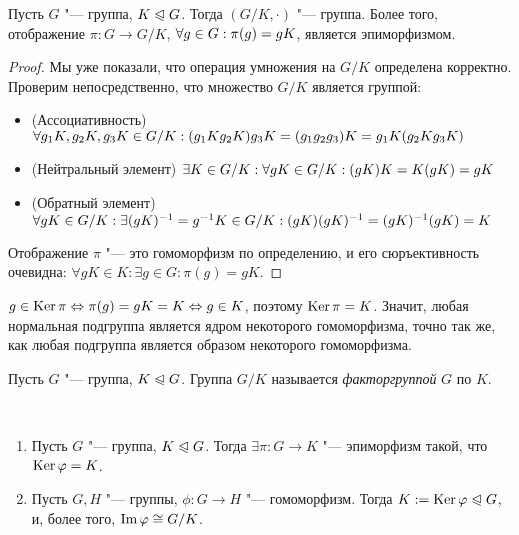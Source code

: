 \begin{proposition}
	 Пусть $G$ "--- группа, $K \trianglelefteqslant G$. Тогда $(G / K, \cdot)$ "--- группа. Более того, отображение $\pi: G \to G / K$, $\forall g \in G: \pi(g) \hm= gK$, является эпиморфизмом.
\end{proposition}

\begin{proof}
	Мы уже показали, что операция умножения на $G / K$ определена корректно. Проверим непосредственно, что множество $G / K$ является группой:
	\begin{itemize}
		\item (Ассоциативность) $\forall g_1K, g_2K, g_3K \in G / K: (g_1Kg_2K)g_3K \hm= (g_1g_2g_3)K \hm= g_1K(g_2Kg_3K)$
		\item (Нейтральный элемент) $\exists K \in G / K: \forall gK \in G / K: (gK)K \hm= K(gK) = gK$
		\item (Обратный элемент) $\forall gK \in G / K: \exists (gK)^{-1} = g^{-1}K \in G / K: (gK)(gK)^{-1} \hm= (gK)^{-1}(gK) = K$
	\end{itemize}

	Отображение $\pi$ "--- это гомоморфизм по определению, и его сюръективность очевидна: $\forall gK \in K: \exists g \in G: \pi(g) = gK$.
\end{proof}

\begin{note}
	$g \in \operatorname{Ker}\pi \Leftrightarrow \pi(g) = gK = K \Leftrightarrow g \in K$, поэтому $\operatorname{Ker}\pi = K$. Значит, любая нормальная подгруппа является ядром некоторого гомоморфизма, точно так же, как любая подгруппа является образом некоторого гомоморфизма.
\end{note}

\begin{definition}
	Пусть $G$ "--- группа, $K \trianglelefteqslant G$. Группа $G / K$ называется \textit{факторгруппой} $G$ по $K$.
\end{definition}

\begin{theorem}~
	\begin{enumerate}
		\item Пусть $G$ "--- группа, $K \trianglelefteqslant G$. Тогда $\exists \pi: G \to K$ "--- эпиморфизм такой, что $\ke\phi \hm= K$.
		\item Пусть $G, H$ "--- группы, $\phi: G \to H$ "--- гомоморфизм. Тогда $K \hm{:=} \ke\phi \normal G$, и, более того, $\operatorname{Im}\varphi \cong G / K$.
	\end{enumerate}
\end{theorem}

